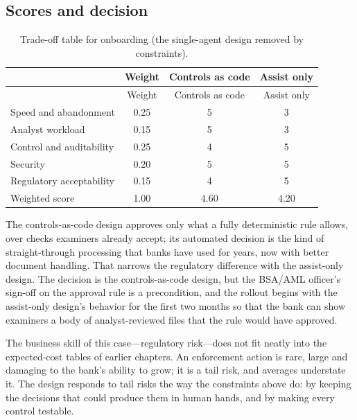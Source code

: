 \subsection{Scores and decision}

\begingroup
\small
\begin{longtable}{@{}lccc@{}}
\caption{Trade-off table for onboarding (the single-agent design removed by constraints).}\label{tab:kyc-tradeoff}\\
\toprule
\rowcolor{coHead} & Weight & Controls as code & Assist only \\
\midrule
\endfirsthead
\toprule
\rowcolor{coHead} & Weight & Controls as code & Assist only \\
\midrule
\endhead
Speed and abandonment & 0.25 & 5 & 3 \\
Analyst workload & 0.15 & 5 & 3 \\
Control and auditability & 0.25 & 4 & 5 \\
Security & 0.20 & 5 & 5 \\
Regulatory acceptability & 0.15 & 4 & 5 \\
\midrule
\rowcolor{coAmberBg} Weighted score & 1.00 & 4.60 & 4.20 \\
\bottomrule
\end{longtable}
\endgroup

The controls-as-code design approves only what a fully deterministic rule allows, over checks examiners already accept; its automated decision is the kind of straight-through processing that banks have used for years, now with better document handling. That narrows the regulatory difference with the assist-only design. The decision is the controls-as-code design, but the BSA/AML officer's sign-off on the approval rule is a precondition, and the rollout begins with the assist-only design's behavior for the first two months so that the bank can show examiners a body of analyst-reviewed files that the rule would have approved.

The business skill of this case---regulatory risk---does not fit neatly into the expected-cost tables of earlier chapters. An enforcement action is rare, large and damaging to the bank's ability to grow; it is a tail risk, and averages understate it. The design responds to tail risks the way the constraints above do: by keeping the decisions that could produce them in human hands, and by making every control testable.
